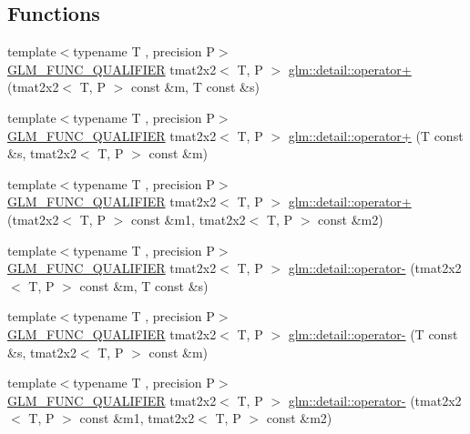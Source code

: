 \subsection*{Functions}
\begin{DoxyCompactItemize}
\item 
{\footnotesize template$<$typename T , precision P$>$ }\\\hyperlink{setup_8hpp_a33fdea6f91c5f834105f7415e2a64407}{G\+L\+M\+\_\+\+F\+U\+N\+C\+\_\+\+Q\+U\+A\+L\+I\+F\+I\+ER} tmat2x2$<$ T, P $>$ \hyperlink{namespaceglm_1_1detail_a6c44eed81bc30aba455f9a7208fb40c3}{glm\+::detail\+::operator+} (tmat2x2$<$ T, P $>$ const \&m, T const \&s)
\item 
{\footnotesize template$<$typename T , precision P$>$ }\\\hyperlink{setup_8hpp_a33fdea6f91c5f834105f7415e2a64407}{G\+L\+M\+\_\+\+F\+U\+N\+C\+\_\+\+Q\+U\+A\+L\+I\+F\+I\+ER} tmat2x2$<$ T, P $>$ \hyperlink{namespaceglm_1_1detail_a09c4a18f01bf131c1ed2f39f8186af4a}{glm\+::detail\+::operator+} (T const \&s, tmat2x2$<$ T, P $>$ const \&m)
\item 
{\footnotesize template$<$typename T , precision P$>$ }\\\hyperlink{setup_8hpp_a33fdea6f91c5f834105f7415e2a64407}{G\+L\+M\+\_\+\+F\+U\+N\+C\+\_\+\+Q\+U\+A\+L\+I\+F\+I\+ER} tmat2x2$<$ T, P $>$ \hyperlink{namespaceglm_1_1detail_afe99a07db37363172f257ed3a6f04b59}{glm\+::detail\+::operator+} (tmat2x2$<$ T, P $>$ const \&m1, tmat2x2$<$ T, P $>$ const \&m2)
\item 
{\footnotesize template$<$typename T , precision P$>$ }\\\hyperlink{setup_8hpp_a33fdea6f91c5f834105f7415e2a64407}{G\+L\+M\+\_\+\+F\+U\+N\+C\+\_\+\+Q\+U\+A\+L\+I\+F\+I\+ER} tmat2x2$<$ T, P $>$ \hyperlink{namespaceglm_1_1detail_ae35804044201bcb73f642bc082f464d2}{glm\+::detail\+::operator-\/} (tmat2x2$<$ T, P $>$ const \&m, T const \&s)
\item 
{\footnotesize template$<$typename T , precision P$>$ }\\\hyperlink{setup_8hpp_a33fdea6f91c5f834105f7415e2a64407}{G\+L\+M\+\_\+\+F\+U\+N\+C\+\_\+\+Q\+U\+A\+L\+I\+F\+I\+ER} tmat2x2$<$ T, P $>$ \hyperlink{namespaceglm_1_1detail_a9caa02aecbee7b366afb6e4c2cfbcfe9}{glm\+::detail\+::operator-\/} (T const \&s, tmat2x2$<$ T, P $>$ const \&m)
\item 
{\footnotesize template$<$typename T , precision P$>$ }\\\hyperlink{setup_8hpp_a33fdea6f91c5f834105f7415e2a64407}{G\+L\+M\+\_\+\+F\+U\+N\+C\+\_\+\+Q\+U\+A\+L\+I\+F\+I\+ER} tmat2x2$<$ T, P $>$ \hyperlink{namespaceglm_1_1detail_aace8611ce01ea60d9c3bd6c720b7951a}{glm\+::detail\+::operator-\/} (tmat2x2$<$ T, P $>$ const \&m1, tmat2x2$<$ T, P $>$ const \&m2)

\end{DoxyCompactItemize}
